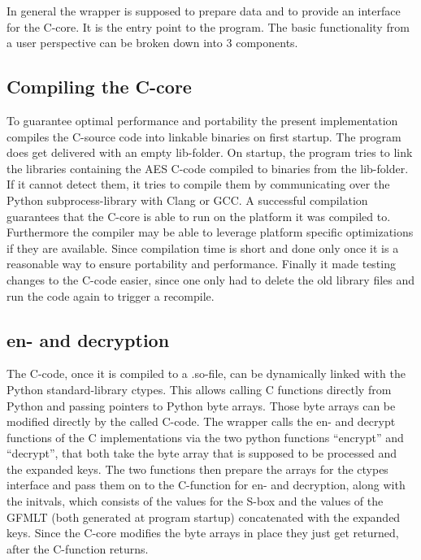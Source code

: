 In general the wrapper is supposed to prepare data and to provide an
interface for the C-core. It is the entry point to the program. The
basic functionality from a user perspective can be broken down into 3
components.

\hypertarget{compiling-the-c-core}{%
\subsection{Compiling the C-core}\label{compiling-the-c-core}}

To guarantee optimal performance and portability the present
implementation compiles the C-source code into linkable binaries on
first startup. The program does get delivered with an empty lib-folder.
On startup, the program tries to link the libraries containing the AES
C-code compiled to binaries from the lib-folder. If it cannot detect
them, it tries to compile them by communicating over the Python
subprocess-library with Clang or GCC. A successful compilation
guarantees that the C-core is able to run on the platform it was
compiled to. Furthermore the compiler may be able to leverage platform
specific optimizations if they are available. Since compilation time is
short and done only once it is a reasonable way to ensure portability
and performance. Finally it made testing changes to the C-code easier,
since one only had to delete the old library files and run the code
again to trigger a recompile.

\hypertarget{en--and-decryption}{%
\subsection{en- and decryption}\label{en--and-decryption}}

The C-code, once it is compiled to a .so-file, can be dynamically linked
with the Python standard-library ctypes. This allows calling C functions
directly from Python and passing pointers to Python byte arrays. Those
byte arrays can be modified directly by the called C-code. The wrapper
calls the en- and decrypt functions of the C implementations via the two
python functions ``encrypt'' and ``decrypt'', that both take the byte
array that is supposed to be processed and the expanded keys. The two
functions then prepare the arrays for the ctypes interface and pass them
on to the C-function for en- and decryption, along with the initvals,
which consists of the values for the S-box and the values of the GFMLT
(both generated at program startup) concatenated with the expanded keys.
Since the C-core modifies the byte arrays in place they just get
returned, after the C-function returns.

